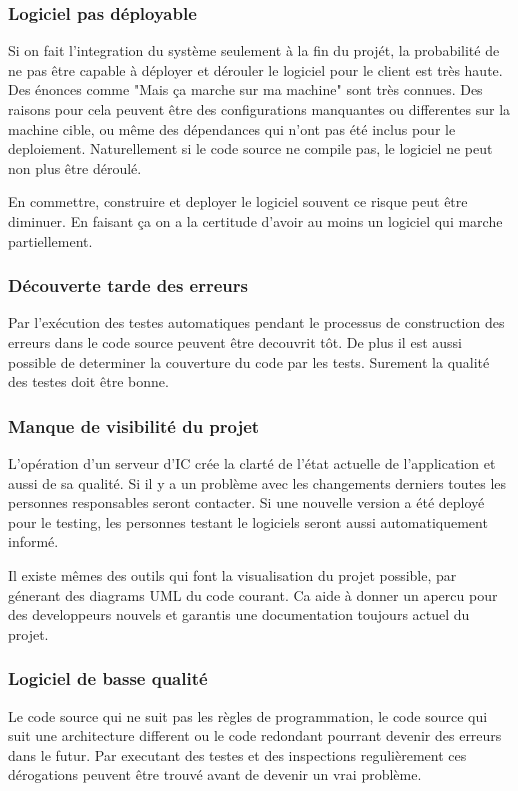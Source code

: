 \subsubsection{Logiciel pas déployable}
Si on fait l'integration du système seulement à la fin du projét, la probabilité de ne pas être capable à déployer et dérouler le logiciel pour le client est très haute. Des énonces comme "Mais ça marche sur ma machine" sont très connues. Des raisons pour cela peuvent être des configurations manquantes ou differentes sur la machine cible, ou même des dépendances qui n'ont pas été inclus pour le deploiement. Naturellement si le code source ne compile pas, le logiciel ne peut non plus être déroulé.

En commettre, construire et deployer le logiciel souvent ce risque peut être diminuer. En faisant ça on a la certitude d'avoir au moins un logiciel qui marche partiellement.
\subsubsection{Découverte tarde des erreurs}
Par l'exécution des testes automatiques pendant le processus de construction des erreurs dans le code source peuvent être decouvrit tôt. De plus il est aussi possible de determiner la couverture du code par les tests. Surement la qualité des testes doit être bonne.
\subsubsection{Manque de visibilité du projet}
L'opération d'un serveur d'IC crée la clarté de l'état actuelle de l'application et aussi de sa qualité. Si il y a un problème avec les changements derniers toutes les personnes responsables seront contacter. Si une nouvelle version a été deployé pour le testing, les personnes testant le logiciels seront aussi automatiquement informé.

Il existe mêmes des outils qui font la visualisation du projet possible, par génerant des diagrams UML du code courant. Ca aide à donner un apercu pour des developpeurs nouvels et garantis une documentation toujours actuel du projet.
\subsubsection{Logiciel de basse qualité }
Le code source qui ne suit pas les règles de programmation, le code source qui suit une architecture different ou le code redondant pourrant devenir des erreurs dans le futur.
Par executant des testes et des inspections regulièrement ces dérogations peuvent être trouvé avant de devenir un vrai problème.
\clearpage

